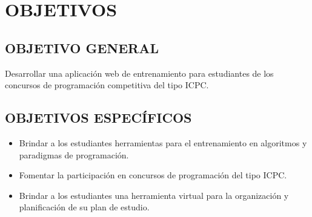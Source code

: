 \section{OBJETIVOS}

\subsection{OBJETIVO GENERAL}
Desarrollar una aplicación web de entrenamiento para estudiantes de los concursos de programación competitiva del tipo ICPC.

\subsection{OBJETIVOS ESPECÍFICOS}
\begin{itemize}[nosep]
    \item[\textbullet] Brindar a los estudiantes herramientas para el entrenamiento en algoritmos y paradigmas de programación. 
    \item[\textbullet] Fomentar la participación en concursos de programación del tipo ICPC. 
    \item[\textbullet] Brindar a los estudiantes una herramienta virtual para la organización y planificación de su plan de estudio.
\end{itemize}